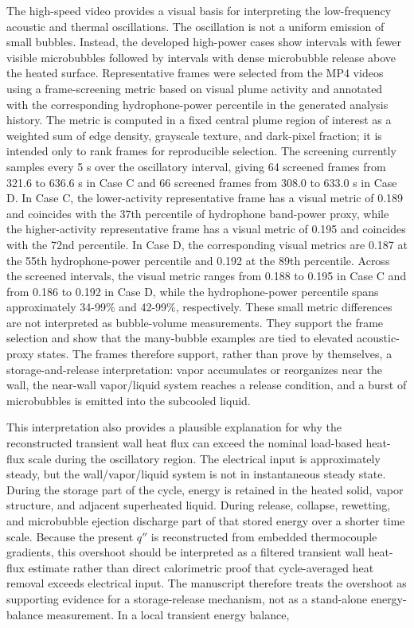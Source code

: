 \documentclass[final,1p,times]{elsarticle}
\begin{document}
The high-speed video provides a visual basis for interpreting the low-frequency acoustic and thermal oscillations. The oscillation is not a uniform emission of small bubbles. Instead, the developed high-power cases show intervals with fewer visible microbubbles followed by intervals with dense microbubble release above the heated surface. Representative frames were selected from the MP4 videos using a frame-screening metric based on visual plume activity and annotated with the corresponding hydrophone-power percentile in the generated analysis history. The metric is computed in a fixed central plume region of interest as a weighted sum of edge density, grayscale texture, and dark-pixel fraction; it is intended only to rank frames for reproducible selection. The screening currently samples every 5 s over the oscillatory interval, giving 64 screened frames from 321.6 to 636.6 s in Case C and 66 screened frames from 308.0 to 633.0 s in Case D. In Case C, the lower-activity representative frame has a visual metric of 0.189 and coincides with the 37th percentile of hydrophone band-power proxy, while the higher-activity representative frame has a visual metric of 0.195 and coincides with the 72nd percentile. In Case D, the corresponding visual metrics are 0.187 at the 55th hydrophone-power percentile and 0.192 at the 89th percentile. Across the screened intervals, the visual metric ranges from 0.188 to 0.195 in Case C and from 0.186 to 0.192 in Case D, while the hydrophone-power percentile spans approximately 34-99\% and 42-99\%, respectively. These small metric differences are not interpreted as bubble-volume measurements. They support the frame selection and show that the many-bubble examples are tied to elevated acoustic-proxy states. The frames therefore support, rather than prove by themselves, a storage-and-release interpretation: vapor accumulates or reorganizes near the wall, the near-wall vapor/liquid system reaches a release condition, and a burst of microbubbles is emitted into the subcooled liquid.

This interpretation also provides a plausible explanation for why the reconstructed transient wall heat flux can exceed the nominal load-based heat-flux scale during the oscillatory region. The electrical input is approximately steady, but the wall/vapor/liquid system is not in instantaneous steady state. During the storage part of the cycle, energy is retained in the heated solid, vapor structure, and adjacent superheated liquid. During release, collapse, rewetting, and microbubble ejection discharge part of that stored energy over a shorter time scale. Because the present $q''$ is reconstructed from embedded thermocouple gradients, this overshoot should be interpreted as a filtered transient wall heat-flux estimate rather than direct calorimetric proof that cycle-averaged heat removal exceeds electrical input. The manuscript therefore treats the overshoot as supporting evidence for a storage-release mechanism, not as a stand-alone energy-balance measurement. In a local transient energy balance,
\end{document}

